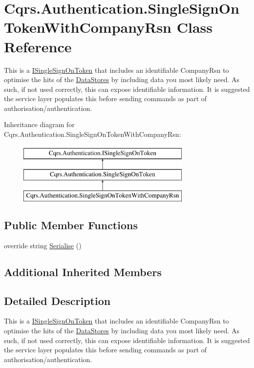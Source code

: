 \hypertarget{classCqrs_1_1Authentication_1_1SingleSignOnTokenWithCompanyRsn}{}\section{Cqrs.\+Authentication.\+Single\+Sign\+On\+Token\+With\+Company\+Rsn Class Reference}
\label{classCqrs_1_1Authentication_1_1SingleSignOnTokenWithCompanyRsn}


This is a \hyperlink{interfaceCqrs_1_1Authentication_1_1ISingleSignOnToken}{I\+Single\+Sign\+On\+Token} that includes an identifiable Company\+Rsn to optimise the hits of the \hyperlink{}{Data\+Stores} by including data you most likely need. As such, if not used correctly, this can expose identifiable information. It is suggested the service layer populates this before sending commands as part of authorisation/authentication.  


Inheritance diagram for Cqrs.\+Authentication.\+Single\+Sign\+On\+Token\+With\+Company\+Rsn\+:\begin{figure}[H]
\begin{center}
\leavevmode
\includegraphics[height=3.000000cm]{classCqrs_1_1Authentication_1_1SingleSignOnTokenWithCompanyRsn}
\end{center}
\end{figure}
\subsection*{Public Member Functions}
\begin{DoxyCompactItemize}
\item 
override string \hyperlink{classCqrs_1_1Authentication_1_1SingleSignOnTokenWithCompanyRsn_a0bc9f0fae90121d029fe0730708f4210}{Serialise} ()
\end{DoxyCompactItemize}
\subsection*{Additional Inherited Members}


\subsection{Detailed Description}
This is a \hyperlink{interfaceCqrs_1_1Authentication_1_1ISingleSignOnToken}{I\+Single\+Sign\+On\+Token} that includes an identifiable Company\+Rsn to optimise the hits of the \hyperlink{}{Data\+Stores} by including data you most likely need. As such, if not used correctly, this can expose identifiable information. It is suggested the service layer populates this before sending commands as part of authorisation/authentication. 



